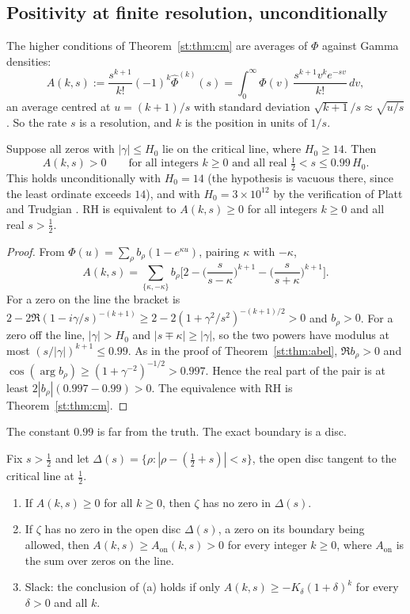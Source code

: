 \subsection{Positivity at finite resolution, unconditionally}
The higher conditions of Theorem~\ref{st:thm:cm} are averages of $\Phi$ against Gamma densities:
\[
A(k,s):=\frac{s^{k+1}}{k!}(-1)^k\hat\Phi^{(k)}(s)=\int_0^\infty\Phi(v)\,\frac{s^{k+1}v^ke^{-sv}}{k!}\,dv ,
\]
an average centred at $u=(k+1)/s$ with standard deviation $\sqrt{k+1}/s\approx\sqrt{u/s}$. So the rate $s$ is a resolution, and $k$ is the position in units of $1/s$.
\begin{theorem}\label{st:thm:res}
Suppose all zeros with $|\gamma|\le H_0$ lie on the critical line, where $H_0\ge14$. Then
\[
A(k,s)>0\qquad\text{for all integers }k\ge0\text{ and all real }\tfrac12<s\le0.99\,H_0 .
\]
This holds unconditionally with $H_0=14$ (the hypothesis is vacuous there, since the least ordinate exceeds $14$), and with $H_0=3\times10^{12}$ by the verification of Platt and Trudgian \cite{PT21}. RH is equivalent to $A(k,s)\ge0$ for all integers $k\ge0$ and all real $s>\tfrac12$.
\end{theorem}
\begin{proof}
From $\Phi(u)=\sum_\rho b_\rho(1-e^{\kappa u})$, pairing $\kappa$ with $-\kappa$,
\[
A(k,s)=\sum_{\{\kappa,-\kappa\}}b_\rho\Big[2-\Big(\frac{s}{s-\kappa}\Big)^{k+1}-\Big(\frac{s}{s+\kappa}\Big)^{k+1}\Big].
\]
For a zero on the line the bracket is $2-2\Re(1-i\gamma/s)^{-(k+1)}\ge2-2(1+\gamma^2/s^2)^{-(k+1)/2}>0$ and $b_\rho>0$. For a zero off the line, $|\gamma|>H_0$ and $|s\mp\kappa|\ge|\gamma|$, so the two powers have modulus at most $(s/|\gamma|)^{k+1}\le0.99$. As in the proof of Theorem~\ref{st:thm:abel}, $\Re b_\rho>0$ and $\cos(\arg b_\rho)\ge(1+\gamma^{-2})^{-1/2}>0.997$. Hence the real part of the pair is at least $2|b_\rho|(0.997-0.99)>0$. The equivalence with RH is Theorem~\ref{st:thm:cm}.
\end{proof}
The constant $0.99$ is far from the truth. The exact boundary is a disc.
\begin{theorem}\label{st:thm:disc}
Fix $s>\tfrac12$ and let $\Delta(s)=\{\rho:|\rho-(\tfrac12+s)|<s\}$, the open disc tangent to the critical line at $\tfrac12$.
\begin{enumerate}
\item[(a)] If $A(k,s)\ge0$ for all $k\ge0$, then $\zeta$ has no zero in $\Delta(s)$.
\item[(b)] If $\zeta$ has no zero in the open disc $\Delta(s)$, a zero on its boundary being allowed, then $A(k,s)\ge A_{\mathrm{on}}(k,s)>0$ for every integer $k\ge0$, where $A_{\mathrm{on}}$ is the sum over zeros on the line.
\item[(c)] Slack: the conclusion of (a) holds if only $A(k,s)\ge-K_\delta(1+\delta)^k$ for every $\delta>0$ and all $k$.
\end{enumerate}
\end{theorem}
